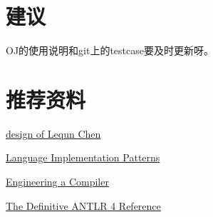 \documentclass[a4paper]{article}
\begin{document}
\section{建议}
OJ的使用说明和git上的testcase要及时更新呀。

\section{推荐资料}
\href{https://github.com/abcdabcd987/compiler2016/blob/master/design/presentation.pdf}{design of Lequn Chen}

\href{https://book.douban.com/subject/4030327/}{Language Implementation Patterns}

\href{https://book.douban.com/subject/5288601/}{Engineering a Compiler}

\href{https://book.douban.com/subject/17912658/}{The Definitive ANTLR 4 Reference}
\end{document}
